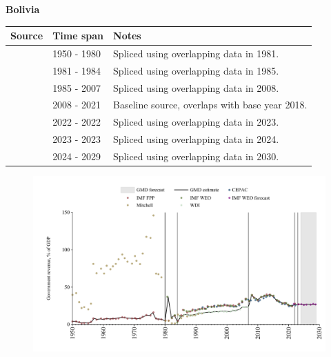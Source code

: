 \documentclass[12pt,a4paper,landscape]{article}
\begin{document}
\begin{adjustbox}{max totalsize={\paperwidth}{\paperheight},center}
\begin{minipage}[t][\textheight][t]{\textwidth}
\vspace*{0.5cm}
{}
\begin{center}
{\Large\bfseries Bolivia}
\end{center}
\vspace{0.5cm}
\begin{table}[H]
\centering
\small
\begin{tabular}{|l|l|l|}
\hline
\textbf{Source} & \textbf{Time span} & \textbf{Notes} \\
\hline
\rowcolor{white}\cite{IMF_FPP}& 1950 - 1980 &Spliced using overlapping data in 1981.\\
\rowcolor{lightgray}\cite{IMF_WEO}& 1981 - 1984 &Spliced using overlapping data in 1985.\\
\rowcolor{white}\cite{WDI}& 1985 - 2007 &Spliced using overlapping data in 2008.\\
\rowcolor{lightgray}\cite{IMF_WEO}& 2008 - 2021 &Baseline source, overlaps with base year 2018.\\
\rowcolor{white}\cite{CEPAC}& 2022 - 2022 &Spliced using overlapping data in 2023.\\
\rowcolor{lightgray}\cite{IMF_FPP}& 2023 - 2023 &Spliced using overlapping data in 2024.\\
\rowcolor{white}\cite{IMF_WEO_forecast}& 2024 - 2029 &Spliced using overlapping data in 2030.\\
\hline
\end{tabular}
\end{table}
\begin{figure}[H]
\centering
\includegraphics[width=\textwidth,height=0.6\textheight,keepaspectratio]{graphs/BOL_govrev_GDP.pdf}
\end{figure}
\end{minipage}
\end{adjustbox}
\end{document}
